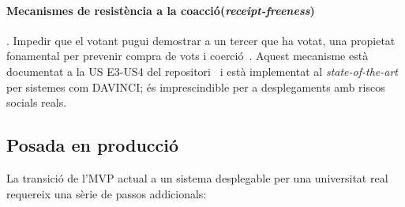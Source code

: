 \paragraph{Mecanismes de resistència a la coacció(\emph{receipt-freeness})}.
Impedir que el votant pugui demostrar a un tercer que ha votat, una propietat fonamental per prevenir compra de vots i
coerció~\cite{benaloh1994receiptfree}.
Aquest mecanisme està documentat a la \ac{US} E3-\ac{US}4 del repositori~\cite{demochainrepo} i està implementat al
\emph{state-of-the-art} per sistemes com DAVINCI; és imprescindible per a desplegaments amb riscos socials reals.

\subsection{Posada en producció}
\label{subsec:posada-en-produccio}

La transició de l'\ac{MVP} actual a un sistema desplegable per una universitat real requereix una sèrie de passos
addicionals:

